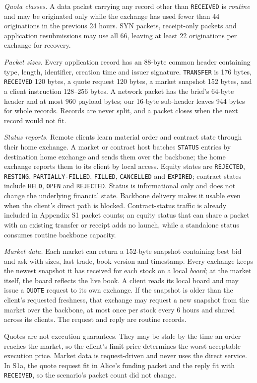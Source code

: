 \documentclass[10pt,letterpaper]{article}
\begin{document}
\emph{Quota classes.} A data packet carrying any record other than \texttt{RECEIVED} is \emph{routine} and may be originated
only while the exchange has used fewer than 44 originations in the previous 24 hours. SYN packets, receipt-only
packets and application resubmissions may use all 66, leaving at least 22 originations per exchange for recovery.

\emph{Packet sizes.} Every application record has an 88-byte common header containing type, length, identifier,
creation time and issuer signature. \texttt{TRANSFER} is 176 bytes, \texttt{RECEIVED} 120 bytes, a quote request 120 bytes, a market
snapshot 152 bytes, and a client instruction 128--256 bytes. A network packet has the brief's 64-byte header and at
most 960 payload bytes; our 16-byte sub-header leaves 944 bytes for whole records. Records are never split, and a
packet closes when the next record would not fit.

\emph{Status reports.} Remote clients learn material order and contract state through their home exchange. A market
or contract host batches \texttt{STATUS} entries by destination home exchange and sends them over the backbone; the home
exchange reports them to its client by local access. Equity states are \texttt{REJECTED}, \texttt{RESTING}, \texttt{PARTIALLY-FILLED}, \texttt{FILLED},
\texttt{CANCELLED} and \texttt{EXPIRED}; contract states include \texttt{HELD}, \texttt{OPEN} and \texttt{REJECTED}. Status is informational only and does not
change the underlying financial state. Backbone delivery makes it usable even when the client's direct path is
blocked. Contract-status traffic is already included in Appendix S1 packet counts; an equity status that can share a
packet with an existing transfer or receipt adds no launch, while a standalone status consumes routine backbone
capacity.

\emph{Market data.} Each market can return a 152-byte snapshot containing best bid and ask with sizes, last trade,
book version and timestamp. Every exchange keeps the newest snapshot it has received for each stock on a local
\emph{board}; at the market itself, the board reflects the live book. A client reads its local board and may issue a
\texttt{QUOTE} request to its own exchange. If the snapshot is older than the client's requested freshness, that exchange may
request a new snapshot from the market over the backbone, at most once per stock every 6 hours and shared across its
clients. The request and reply are routine records.

Quotes are not execution guarantees. They may be stale by the time an order reaches the market, so the client's limit
price determines the worst acceptable execution price. Market data is request-driven and never uses the direct
service. In S1a, the quote request fit in Alice's funding packet and the reply fit with \texttt{RECEIVED}, so the scenario's
packet count did not change. 
\end{document}

